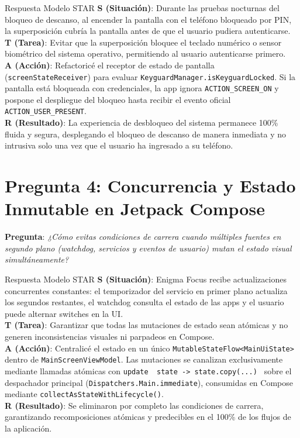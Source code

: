 \documentclass[11pt,a4paper,oneside]{report}
\begin{document}
\begin{starbox}{Respuesta Modelo STAR}
\textbf{\color{starSituation}S (Situación)}: Durante las pruebas nocturnas del bloqueo de descanso, al encender la pantalla con el teléfono bloqueado por PIN, la superposición cubría la pantalla antes de que el usuario pudiera autenticarse.\\[0.15cm]
\textbf{\color{starTask}T (Tarea)}: Evitar que la superposición bloquee el teclado numérico o sensor biométrico del sistema operativo, permitiendo al usuario autenticarse primero.\\[0.15cm]
\textbf{\color{starAction}A (Acción)}: Refactoricé el receptor de estado de pantalla (\texttt{screenStateReceiver}) para evaluar \texttt{KeyguardManager.isKeyguardLocked}. Si la pantalla está bloqueada con credenciales, la app ignora \texttt{ACTION\_SCREEN\_ON} y pospone el despliegue del bloqueo hasta recibir el evento oficial \texttt{ACTION\_USER\_PRESENT}.\\[0.15cm]
\textbf{\color{starResult}R (Resultado)}: La experiencia de desbloqueo del sistema permanece 100\% fluida y segura, desplegando el bloqueo de descanso de manera inmediata y no intrusiva solo una vez que el usuario ha ingresado a su teléfono.
\end{starbox}

\section{Pregunta 4: Concurrencia y Estado Inmutable en Jetpack Compose}
\textbf{Pregunta}: \textit{¿Cómo evitas condiciones de carrera cuando múltiples fuentes en segundo plano (watchdog, servicios y eventos de usuario) mutan el estado visual simultáneamente?}

\begin{starbox}{Respuesta Modelo STAR}
\textbf{\color{starSituation}S (Situación)}: Enigma Focus recibe actualizaciones concurrentes constantes: el temporizador del servicio en primer plano actualiza los segundos restantes, el watchdog consulta el estado de las apps y el usuario puede alternar switches en la UI.\\[0.15cm]
\textbf{\color{starTask}T (Tarea)}: Garantizar que todas las mutaciones de estado sean atómicas y no generen inconsistencias visuales ni parpadeos en Compose.\\[0.15cm]
\textbf{\color{starAction}A (Acción)}: Centralicé el estado en un único \texttt{MutableStateFlow<MainUiState>} dentro de \texttt{MainScreenViewModel}. Las mutaciones se canalizan exclusivamente mediante llamadas atómicas con \texttt{update { state -> state.copy(...) }} sobre el despachador principal (\texttt{Dispatchers.Main.immediate}), consumidas en Compose mediante \texttt{collectAsStateWithLifecycle()}.\\[0.15cm]
\textbf{\color{starResult}R (Resultado)}: Se eliminaron por completo las condiciones de carrera, garantizando recomposiciones atómicas y predecibles en el 100\% de los flujos de la aplicación.
\end{starbox}
\end{document}
